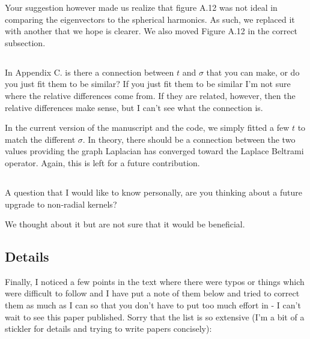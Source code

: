 \documentclass[12pt,a4paper]{article}
\newcommand{\1}{\b{1}}              %
\newcommand{\0}{\b{0}}              %
\begin{document}
Your suggestion however made us realize that figure A.12 was not ideal in comparing the eigenvectors to the spherical harmonics.
As such, we replaced it with another that we hope is clearer.
We also moved Figure A.12 in the correct subsection.

\subsection{}
\begin{mdframed}[style=comment]
In Appendix C. is there a connection between $t$ and $\sigma$ that you can make, or do you just fit them to be similar? If you just fit them to be similar I'm not sure where the relative differences come from. If they are related, however, then the relative differences make sense, but I can't see what the connection is.
\end{mdframed}

In the current version of the manuscript and the code, we simply fitted a few $t$ to match the different $\sigma$.
In theory, there should be a connection between the two values providing the graph Laplacian has converged toward the Laplace Beltrami operator.
Again, this is left for a future contribution.

\subsection{}
\begin{mdframed}[style=comment]
A question that I would like to know personally, are you thinking about a future upgrade to non-radial kernels?
\end{mdframed}

We thought about it but are not sure that it would be beneficial.


\subsection{Details}
\begin{mdframed}[style=comment]
Finally, I noticed a few points in the text where there were typos or things which were difficult to follow and I have put a note of them below and tried to correct them as much as I can so that you don't have to put too much effort in - I can't wait to see this paper published. Sorry that the list is so extensive (I'm a bit of a stickler for details and trying to write papers concisely):
\end{mdframed}
\end{document}

